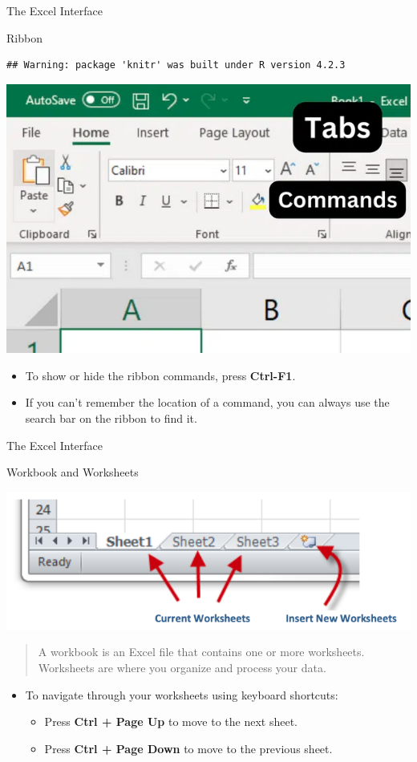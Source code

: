 \documentclass[
  10pt,
  ignorenonframetext,
]{beamer}
\begin{document}
\begin{frame}[fragile]{The Excel Interface}
\protect\hypertarget{the-excel-interface-1}{}
\begin{block}{Ribbon}
\protect\hypertarget{ribbon-1}{}
\begin{verbatim}
## Warning: package 'knitr' was built under R version 4.2.3
\end{verbatim}

\begin{center}\includegraphics[width=0.5\linewidth]{pictures/Excel-ribbon} \end{center}

\begin{itemize}
\item
  To show or hide the ribbon commands, press \textbf{Ctrl-F1}.
\item
  If you can't remember the location of a command, you can always use
  the search bar on the ribbon to find it.
\end{itemize}
\end{block}
\end{frame}

\begin{frame}{The Excel Interface}
\protect\hypertarget{the-excel-interface-2}{}
\begin{block}{Workbook and Worksheets}
\protect\hypertarget{workbook-and-worksheets-1}{}
\begin{center}\includegraphics[width=0.5\linewidth]{pictures/Excel-worksheets} \end{center}

\begin{quote}
A workbook is an Excel file that contains one or more worksheets.
Worksheets are where you organize and process your data.
\end{quote}

\begin{itemize}
\item
  To navigate through your worksheets using keyboard shortcuts:

  \begin{itemize}
  \item
    Press \textbf{Ctrl + Page Up} to move to the next sheet.
  \item
    Press \textbf{Ctrl + Page Down} to move to the previous sheet.
  \end{itemize}
\end{itemize}
\end{block}
\end{frame}
\end{document}
